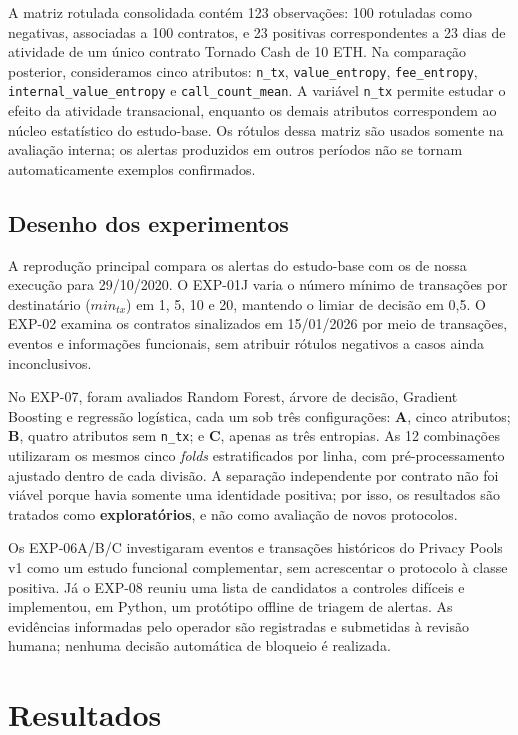 \documentclass[12pt,a4paper]{article}
\begin{document}
A matriz rotulada consolidada contém 123 observações: 100 rotuladas como negativas, associadas a 100 contratos, e 23 positivas correspondentes a 23 dias de atividade de um único contrato Tornado Cash de 10 ETH. Na comparação posterior, consideramos cinco atributos: \texttt{n\_tx}, \texttt{value\_entropy}, \texttt{fee\_entropy}, \texttt{internal\_value\_entropy} e \texttt{call\_count\_mean}. A variável \texttt{n\_tx} permite estudar o efeito da atividade transacional, enquanto os demais atributos correspondem ao núcleo estatístico do estudo-base. Os rótulos dessa matriz são usados somente na avaliação interna; os alertas produzidos em outros períodos não se tornam automaticamente exemplos confirmados.

\subsection{Desenho dos experimentos}
A reprodução principal compara os alertas do estudo-base com os de nossa execução para 29/10/2020. O EXP-01J varia o número mínimo de transações por destinatário (\(min_{tx}\)) em 1, 5, 10 e 20, mantendo o limiar de decisão em 0,5. O EXP-02 examina os contratos sinalizados em 15/01/2026 por meio de transações, eventos e informações funcionais, sem atribuir rótulos negativos a casos ainda inconclusivos.

No EXP-07, foram avaliados Random Forest, árvore de decisão, Gradient Boosting e regressão logística, cada um sob três configurações: \textbf{A}, cinco atributos; \textbf{B}, quatro atributos sem \texttt{n\_tx}; e \textbf{C}, apenas as três entropias. As 12 combinações utilizaram os mesmos cinco \emph{folds} estratificados por linha, com pré-processamento ajustado dentro de cada divisão. A separação independente por contrato não foi viável porque havia somente uma identidade positiva; por isso, os resultados são tratados como \textbf{exploratórios}, e não como avaliação de novos protocolos.

Os EXP-06A/B/C investigaram eventos e transações históricos do Privacy Pools v1 como um estudo funcional complementar, sem acrescentar o protocolo à classe positiva. Já o EXP-08 reuniu uma lista de candidatos a controles difíceis e implementou, em Python, um protótipo offline de triagem de alertas. As evidências informadas pelo operador são registradas e submetidas à revisão humana; nenhuma decisão automática de bloqueio é realizada.

\section{Resultados}
\end{document}
